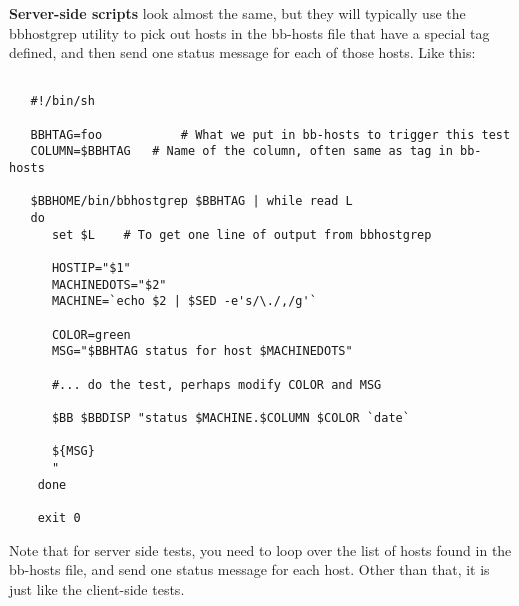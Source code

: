  \textbf{Server-side scripts}
 look almost the same, but they will typically use the bbhostgrep utility to pick out hosts in the bb-hosts file that have a special tag defined, and then send one status message for each of those hosts. Like this:
\begin{verbatim}

   #!/bin/sh

   BBHTAG=foo           # What we put in bb-hosts to trigger this test
   COLUMN=$BBHTAG	# Name of the column, often same as tag in bb-hosts

   $BBHOME/bin/bbhostgrep $BBHTAG | while read L
   do
      set $L	# To get one line of output from bbhostgrep

      HOSTIP="$1"
      MACHINEDOTS="$2"
      MACHINE=`echo $2 | $SED -e's/\./,/g'`

      COLOR=green
      MSG="$BBHTAG status for host $MACHINEDOTS"

      #... do the test, perhaps modify COLOR and MSG

      $BB $BBDISP "status $MACHINE.$COLUMN $COLOR `date`

      ${MSG}
      "
    done

    exit 0

\end{verbatim}


 Note that for server side tests, you need to loop over the list of hosts found in the bb-hosts file, and send one status message for each host. Other than that, it is just like the client-side tests.
\hline 


